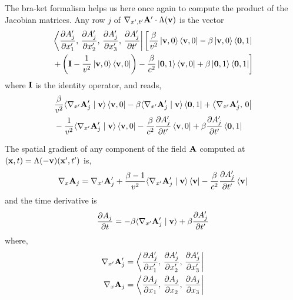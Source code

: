 \documentclass[12pt]{article}
\newcommand{\ds}{\displaystyle}
\newcommand{\ip}[2]{\langle #1 \mid #2 \rangle}
\begin{document}
The bra-ket formalism helps us here once again to compute the product of the Jacobian
matrices. Any row $j$ of $\nabla_{x',t'}\vb{A}' \cdot \Lambda(\vb{v})$ is the vector
\begin{equation}
  \begin{aligned}
    &\bra{\ds\pdv{A'_j}{x'_1},\, \ds\pdv{A'_j}{x'_2},\, \ds\pdv{A'_j}{x'_3},\, \ds\pdv{A'_j}{t'}}
    \left[
      \frac{\beta}{v^2}\ket{\vb{v},0}\bra{\vb{v},0}
      - \beta\ket{\vb{v},0}\bra{\vb{0},1} \right.\\
    &\left.
      + \left(\vb{I} - \frac{1}{v^2}\ket{\vb{v},0}\bra{\vb{v},0}\right)
      - \frac{\beta}{c^2}\ket{\vb{0},1}\bra{\vb{v},0}
      + \beta\ket{\vb{0},1}\bra{\vb{0},1}
    \right]
  \end{aligned}
\end{equation}
where $\vb{I}$ is the identity operator, and reads,
\begin{equation}
  \begin{aligned}
    &\frac{\beta}{v^2}\ip{\nabla_{x'}\vb{A}'_j}{\vb{v}}\bra{\vb{v},0}
    - \beta\ip{\nabla_{x'}\vb{A}'_j}{\vb{v}}\bra{\vb{0},1}
    + \bra{\nabla_{x'}\vb{A}'_j,\,0} \\
    &- \frac{1}{v^2}\ip{\nabla_{x'}\vb{A}'_j}{\vb{v}}\bra{\vb{v},0}
    - \frac{\beta}{c^2}\ds\pdv{A'_j}{t'}\bra{\vb{v},0}
    + \beta\ds\pdv{A'_j}{t'}\bra{\vb{0},1}
  \end{aligned}
\end{equation}

The spatial gradient of any component of the field $\vb{A}$ computed at
$(\vb{x},t) = \Lambda(-\vb{v})(\vb{x}',t')$ is,
\begin{equation}
  \nabla_x \vb{A}_j = \nabla_{x'}\vb{A}'_j
    + \frac{\beta-1}{v^2}\ip{\nabla_{x'}\vb{A}'_j}{\vb{v}}\bra{\vb{v}}
    - \frac{\beta}{c^2}\ds\pdv{A'_j}{t'}\bra{\vb{v}}
  \label{eq:gradient_in_F}
\end{equation}
and the time derivative is
\begin{equation}
  \pdv{A_j}{t} = -\beta\ip{\nabla_{x'}\vb{A}'_j}{\vb{v}} + \beta\pdv{A'_j}{t'}
  \label{eq:time_derivative_in_F}
\end{equation}
where,
\begin{align}
  \nabla_{x'}\vb{A}'_j &= \bra{\ds\pdv{A'_j}{x'_1},\, \ds\pdv{A'_j}{x'_2},\, \ds\pdv{A'_j}{x'_3}} \\
  \nabla_x \vb{A}_j    &= \bra{\ds\pdv{A_j}{x_1},\, \ds\pdv{A_j}{x_2},\, \ds\pdv{A_j}{x_3}}
\end{align}
\end{document}
